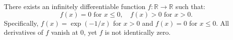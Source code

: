 There exists an infinitely differentiable function $f: \mathbb{R} \to \mathbb{R}$ such that:
\[
f(x) = 0 \text{ for } x \leq 0, \quad f(x) > 0 \text{ for } x > 0.
\]
Specifically, $f(x) = \exp(-1/x)$ for $x > 0$ and $f(x) = 0$ for $x \leq 0$. All derivatives of $f$ vanish at $0$, yet $f$ is not identically zero.

